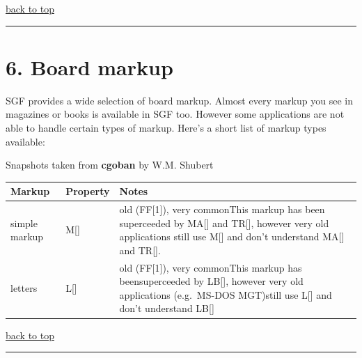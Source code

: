 \href{https://red-bean.com/sgf/user_guide/index.html\#toc}{back to top}

\begin{center}\rule{0.5\linewidth}{0.5pt}\end{center}

\section{6. Board markup}\label{board-markup}

SGF provides a wide selection of board markup. Almost every markup you
see in magazines or books is available in SGF too. However some
applications are not able to handle certain types of markup. Here's a
short list of markup types available:

Snapshots taken from \textbf{cgoban} by W.M. Shubert

{\def\LTcaptype{none} %
\begin{longtable}[]{@{}
  >{\raggedright\arraybackslash}p{}
  >{\raggedright\arraybackslash}p{}
  >{\raggedright\arraybackslash}p{}@{}}
\toprule\noalign{}
\begin{minipage}[b]{\linewidth}\raggedright
Markup
\end{minipage} & \begin{minipage}[b]{\linewidth}\raggedright
Property
\end{minipage} & \begin{minipage}[b]{\linewidth}\raggedright
Notes
\end{minipage} \\
\midrule\noalign{}
\endhead
\bottomrule\noalign{}
\endlastfoot
simple markup & M{[}{]} & old (FF{[}1{]}), very commonThis markup has
been superceeded by MA{[}{]} and TR{[}{]}, however very old applications
still use M{[}{]} and don't understand MA{[}{]} and TR{[}{]}. \\
letters & L{[}{]} & old (FF{[}1{]}), very commonThis markup has
beensuperceeded by LB{[}{]}, however very old applications (e.g.~MS-DOS
MGT)still use L{[}{]} and don't understand LB{[}{]} \\
\end{longtable}
}

\href{https://red-bean.com/sgf/user_guide/index.html\#toc}{back to top}

\begin{center}\rule{0.5\linewidth}{0.5pt}\end{center}

